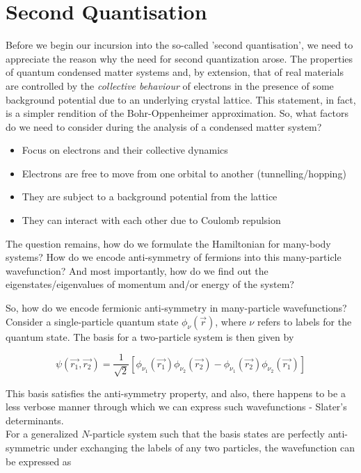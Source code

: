\chapter{Second Quantisation}

Before we begin our incursion into the so-called 'second quantisation', we need to appreciate the reason why the need for second quantization arose. The properties of quantum condensed matter systems and, by extension, that of real materials are controlled by the \textit{collective behaviour} of electrons in the presence of some background potential due to an underlying crystal lattice. This statement, in fact, is a simpler rendition of the Bohr-Oppenheimer approximation. So, what factors do we need to consider during the analysis of a condensed matter system?
\begin{itemize}
    \item Focus on electrons and their collective dynamics
    \item Electrons are free to move from one orbital to another (tunnelling/hopping)
    \item They are subject to a background potential from the lattice
    \item They can interact with each other due to Coulomb repulsion
\end{itemize}
The question remains, how do we formulate the Hamiltonian for many-body systems? How do we encode anti-symmetry of fermions into this many-particle wavefunction? And most importantly, how do we find out the eigenstates/eigenvalues of momentum and/or energy of the system?  \par

So, how do we encode fermionic anti-symmetry in many-particle wavefunctions? \\
Consider a single-particle quantum state $\phi_{\nu}(\vec{r})$, where $\nu$ refers to labels for the quantum state. The basis for a two-particle system is then given by 

\begin{equation*}
    \psi(\vec{r_{1}}, \vec{r_{2}}) = \frac{1}{\sqrt{2}}[\phi_{\nu_{1}}(\vec{r_{1}}) \phi_{\nu_{2}}(\vec{r_{2}}) - \phi_{\nu_{1}}(\vec{r_{2}}) \phi_{\nu_{2}}(\vec{r_{1}})]
\end{equation*}

This basis satisfies the anti-symmetry property, and also, there happens to be a less verbose manner through which we can express such wavefunctions - Slater's determinants. \\
For a generalized $N$-particle system such that the basis states are perfectly anti-symmetric under exchanging the labels of any two particles, the wavefunction can be expressed as

